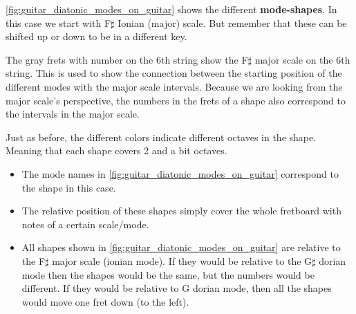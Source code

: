\autoref{fig:guitar_diatonic_modes_on_guitar} shows the different \textbf{mode-shapes}. In this case we start with F$\sharp$ Ionian (major) scale. But remember that these can be shifted up or down to be in a different key.

The gray frets with number on the 6th string show the F$\sharp$ major scale on the 6th string. This is used to show the connection between the starting position of the different modes with the major scale intervals. Because we are looking from the major scale's perspective, the numbers in the frets of a shape also correspond to the intervals in the major scale.

Just as before, the different colors indicate different octaves in the shape. Meaning that each shape covers 2 and a bit octaves.

\infobox
{
	\begin{itemize}
		\item The mode names in \autoref{fig:guitar_diatonic_modes_on_guitar} correspond to the shape in this case.
		\item The relative position of these shapes simply cover the whole fretboard with notes of a certain scale/mode.
		\item All shapes shown in \autoref{fig:guitar_diatonic_modes_on_guitar} are relative to the F$\sharp$ major scale (ionian mode). If they would be relative to the G$\sharp$ dorian mode then the shapes would be the same, but the numbers would be different. If they would be relative to G dorian mode, then all the shapes would move one fret down (to the left). 
	\end{itemize}
}

\newpage

